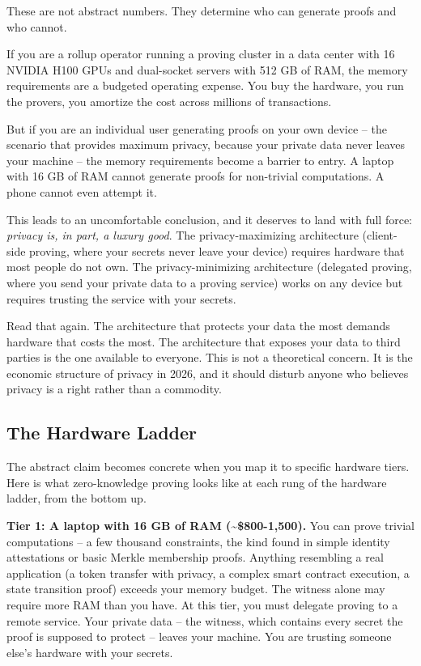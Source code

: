 \documentclass[
  11pt,
  openany]{report}
\renewcommand{\textbf}[1]{{\bfseries\color{MidnightBold}#1}}
\begin{document}
These are not abstract numbers. They determine who can generate proofs and who
cannot.

If you are a rollup operator running a proving cluster in a data center with 16
NVIDIA H100 GPUs and dual-socket servers with 512 GB of RAM, the memory
requirements are a budgeted operating expense. You buy the hardware, you run the
provers, you amortize the cost across millions of transactions.

But if you are an individual user generating proofs on your own device -- the
scenario that provides maximum privacy, because your private data never leaves
your machine -- the memory requirements become a barrier to entry. A laptop with
16 GB of RAM cannot generate proofs for non-trivial computations. A phone cannot
even attempt it.

This leads to an uncomfortable conclusion, and it deserves to land with full
force: \emph{privacy is, in part, a luxury good}. The privacy-maximizing
architecture (client-side proving, where your secrets never leave your device)
requires hardware that most people do not own. The privacy-minimizing
architecture (delegated proving, where you send your private data to a proving
service) works on any device but requires trusting the service with your
secrets.

Read that again. The architecture that protects your data the most demands
hardware that costs the most. The architecture that exposes your data to third
parties is the one available to everyone. This is not a theoretical concern. It
is the economic structure of privacy in 2026, and it should disturb anyone who
believes privacy is a right rather than a commodity.

\subsection{The Hardware Ladder}\label{the-hardware-ladder}

The abstract claim becomes concrete when you map it to specific hardware tiers.
Here is what zero-knowledge proving looks like at each rung of the hardware
ladder, from the bottom up.

\textbf{Tier 1: A laptop with 16 GB of RAM (\textasciitilde\$800-1,500).} You
can prove trivial computations -- a few thousand constraints, the kind found in
simple identity attestations or basic Merkle membership proofs. Anything
resembling a real application (a token transfer with privacy, a complex smart
contract execution, a state transition proof) exceeds your memory budget. The
witness alone may require more RAM than you have. At this tier, you must
delegate proving to a remote service. Your private data -- the witness, which
contains every secret the proof is supposed to protect -- leaves your machine.
You are trusting someone else's hardware with your secrets.
\end{document}
